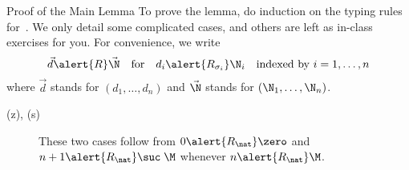 \begin{frame}{Proof of the Main Lemma}
  To prove the lemma, do induction on the typing rules for~\PCF{}. 
  We only detail some complicated cases, and others are left as in-class
  exercises for you. For convenience, we write
  \[
    \vec{d} \alert{\mathrel{R}} \vec{\N}
    \quad\text{for}\quad
    d_i \alert{\mathrel{R_{\sigma_i}}} \N_i
    \quad\text{indexed by~$i = 1, \dots, n$}
  \]
  where $\vec{d}$ stands for $(d_1, \dots, d_n)$
  and $\vec{\N}$ stands for $(\N_1, \dots, \N_n)$.
  \begin{description}
    \item[(z), (s)] These two cases follow from
      $0\alert{\mathrel{R}_\nat}\zero$ and $n+1 \alert{\mathrel{R_\nat}}
      \suc\;\M$ whenever $n \alert{\mathrel{R_\nat}} \M$. 
  \end{description}
\end{frame}

